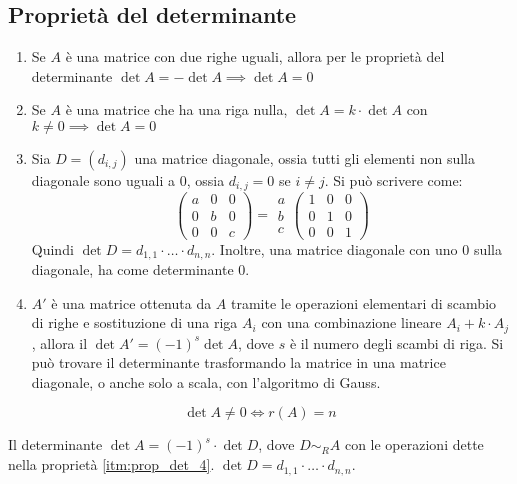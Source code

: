 \subsection{Propriet\`a del determinante}

\begin{enumerate}
    \item Se $A$ \`e una matrice con due righe uguali, allora per le propriet\`a del determinante $\det{A} = - \det{A} \implies \det{A} = 0$
    \item Se $A$ \`e una matrice che ha una riga nulla, $\det{A} = k \cdot \det{A} $ con $ k \neq 0 \implies \det{A} = 0$
    \item Sia $D = (d_{i,j})$ una matrice diagonale, ossia tutti gli elementi non sulla diagonale sono uguali a 0, ossia $d_{i,j} = 0$ se $i \neq j$. Si pu\`o scrivere come:
    \[
    \begin{pmatrix}
    a & 0 & 0 \\
    0 & b & 0 \\
    0 & 0 & c
    \end{pmatrix}
    = 
    \begin{matrix}
    a \\ b \\ c 
    \end{matrix}
    \begin{pmatrix}
    1 & 0 & 0 \\
    0 & 1 & 0 \\
    0 & 0 & 1
    \end{pmatrix}
    \]
    Quindi $\det D = d_{1,1} \cdot \ldots \cdot d_{n,n}$. Inoltre, una matrice diagonale con uno 0 sulla diagonale, ha come determinante 0.
    \item\label{itm:prop_det_4} $A'$ \`e una matrice ottenuta da $A$ tramite le operazioni elementari di scambio di righe e sostituzione di una riga $A_i$ con una combinazione lineare $A_i + k \cdot A_j$, allora il $\det{A'} = (-1)^s \det{A}$, dove $s$ \`e il numero degli scambi di riga. Si pu\`o trovare il determinante trasformando la matrice in una matrice diagonale, o anche solo a scala, con l'algoritmo di Gauss.
\end{enumerate}

\begin{prop}
\[
\det{A} \neq 0 \iff r(A) = n
\]
\end{prop}
Il determinante $\det{A} = (-1)^s \cdot \det{D}$, dove $D \sim_{R} A$ con le operazioni dette nella propriet\`a \ref{itm:prop_det_4}. $\det{D} = d_{1,1} \cdot \ldots \cdot d_{n,n}$.

